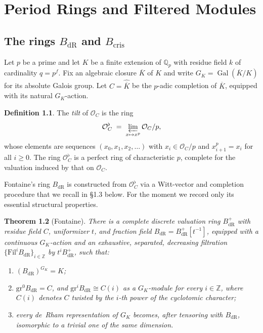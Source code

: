 \documentclass[10pt]{amsbook}
\newtheorem{theorem}{Theorem}[chapter]
\theoremstyle{definition}
\newtheorem{definition}[theorem]{Definition}
\theoremstyle{remark}
\DeclareMathOperator{\Gal}{Gal}
\newcommand{\Qp}{\mathbb{Q}_p}
\begin{document}
\mainmatter

\chapter{Period Rings and Filtered Modules}
\label{ch:period-rings}

\section{The rings \texorpdfstring{$B_{\mathrm{dR}}$}{BdR} and \texorpdfstring{$B_{\mathrm{cris}}$}{Bcris}}
\label{sec:bdr-bcris}

Let $p$ be a prime and let $K$ be a finite extension of $\Qp$ with residue field $k$ of
cardinality $q = p^f$. Fix an algebraic closure $\overline K$ of $K$ and write
$G_K = \Gal(\overline K/K)$ for its absolute Galois group. Let $C = \widehat{\overline K}$ be
the $p$-adic completion of $\overline K$, equipped with its natural $G_K$-action.

\begin{definition}\label{def:tilt}
The \emph{tilt} of $\mathcal{O}_C$ is the ring
\[
  \mathcal{O}_C^{\flat} \;=\; \varprojlim_{x \mapsto x^p} \mathcal{O}_C/p,
\]
whose elements are sequences $(x_0, x_1, x_2, \dots)$ with $x_i \in \mathcal{O}_C/p$ and
$x_{i+1}^p = x_i$ for all $i \geq 0$. The ring $\mathcal{O}_C^\flat$ is a perfect ring of
characteristic $p$, complete for the valuation induced by that on $\mathcal{O}_C$.
\end{definition}

Fontaine's ring $B_{\mathrm{dR}}$ is constructed from $\mathcal{O}_C^\flat$ via a
Witt-vector and completion procedure that we recall in \S 1.3 below. For the
moment we record only its essential structural properties.

\begin{theorem}[Fontaine]\label{thm:bdr-properties}
There is a complete discrete valuation ring $B_{\mathrm{dR}}^+$ with residue field $C$,
uniformizer $t$, and fraction field $B_{\mathrm{dR}} = B_{\mathrm{dR}}^+[t^{-1}]$, equipped
with a continuous $G_K$-action and an exhaustive, separated, decreasing filtration
$\{\mathrm{Fil}^i B_{\mathrm{dR}}\}_{i \in \mathbb{Z}}$ by $t^i B_{\mathrm{dR}}^+$, such that:
\begin{enumerate}[label=\textup{(\roman*)}]
  \item $(B_{\mathrm{dR}})^{G_K} = K$;
  \item $\mathrm{gr}^0 B_{\mathrm{dR}} = C$, and $\mathrm{gr}^i B_{\mathrm{dR}} \cong C(i)$ as
    a $G_K$-module for every $i \in \mathbb{Z}$, where $C(i)$ denotes $C$ twisted by the
    $i$-th power of the cyclotomic character;
  \item every de~Rham representation of $G_K$ becomes, after tensoring with $B_{\mathrm{dR}}$,
    isomorphic to a trivial one of the same dimension.
\end{enumerate}
\end{theorem}
\end{document}
